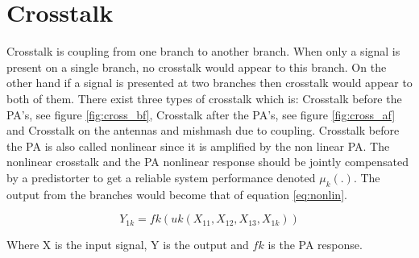 \section{Crosstalk}
Crosstalk is coupling from one branch to another branch. When only a signal is present on a single branch, no crosstalk would appear to this branch. On the other hand if a signal is presented at two branches then crosstalk would appear to both of them. There exist three types of crosstalk which is: Crosstalk before the PA's, see figure \ref{fig:cross_bf}, Crosstalk after the PA's, see figure \ref{fig:cross_af} and Crosstalk on the antennas and mishmash due to coupling. Crosstalk before the PA is also called nonlinear since it is amplified by the non linear PA. The nonlinear crosstalk and the PA nonlinear response should be jointly
compensated by a predistorter to get a reliable system performance \citep{islam2017} denoted $\mu_k (.)$. The output from the branches would become that of equation \ref{eq:nonlin}.

\begin{equation} \label{eq:nonlin}
Y_{1k} = fk(uk(X_{11},X_{12},X_{13},X_{1k}))
\end{equation}   

Where X is the input signal, Y is the output and $fk$ is the PA response. 

